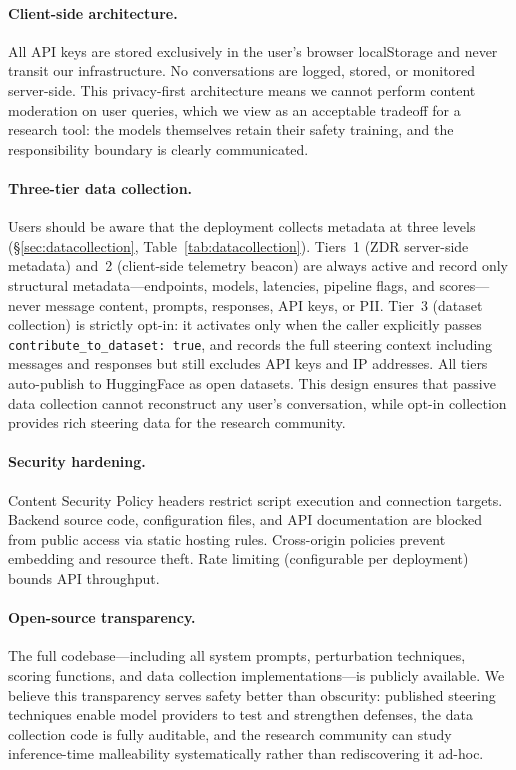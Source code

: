 \documentclass[11pt]{article}
\begin{document}
\paragraph{Client-side architecture.} All API keys are stored exclusively in the user's browser localStorage and never transit our infrastructure. No conversations are logged, stored, or monitored server-side. This privacy-first architecture means we cannot perform content moderation on user queries, which we view as an acceptable tradeoff for a research tool: the models themselves retain their safety training, and the responsibility boundary is clearly communicated.

\paragraph{Three-tier data collection.} Users should be aware that the deployment collects metadata at three levels (\S\ref{sec:datacollection}, Table~\ref{tab:datacollection}). Tiers~1 (ZDR server-side metadata) and~2 (client-side telemetry beacon) are always active and record only structural metadata---endpoints, models, latencies, pipeline flags, and scores---never message content, prompts, responses, API keys, or PII. Tier~3 (dataset collection) is strictly opt-in: it activates only when the caller explicitly passes \texttt{contribute\_to\_dataset: true}, and records the full steering context including messages and responses but still excludes API keys and IP addresses. All tiers auto-publish to HuggingFace as open datasets. This design ensures that passive data collection cannot reconstruct any user's conversation, while opt-in collection provides rich steering data for the research community.

\paragraph{Security hardening.} Content Security Policy headers restrict script execution and connection targets. Backend source code, configuration files, and API documentation are blocked from public access via static hosting rules. Cross-origin policies prevent embedding and resource theft. Rate limiting (configurable per deployment) bounds API throughput.

\paragraph{Open-source transparency.} The full codebase---including all system prompts, perturbation techniques, scoring functions, and data collection implementations---is publicly available. We believe this transparency serves safety better than obscurity: published steering techniques enable model providers to test and strengthen defenses, the data collection code is fully auditable, and the research community can study inference-time malleability systematically rather than rediscovering it ad-hoc.
\end{document}
